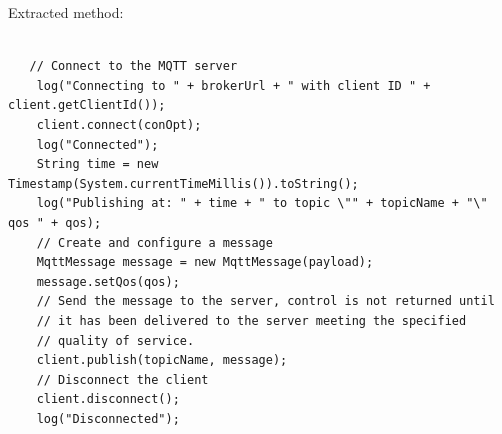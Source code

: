 \vspace{5mm}
\newpage
Extracted method:
\begin{lstlisting}

   // Connect to the MQTT server
    log("Connecting to " + brokerUrl + " with client ID " + client.getClientId());
    client.connect(conOpt);
    log("Connected");
    String time = new Timestamp(System.currentTimeMillis()).toString();
    log("Publishing at: " + time + " to topic \"" + topicName + "\" qos " + qos);
    // Create and configure a message
    MqttMessage message = new MqttMessage(payload);
    message.setQos(qos);
    // Send the message to the server, control is not returned until
    // it has been delivered to the server meeting the specified
    // quality of service.
    client.publish(topicName, message);
    // Disconnect the client
    client.disconnect();
    log("Disconnected");
 \end{lstlisting}
\vspace{5mm}

